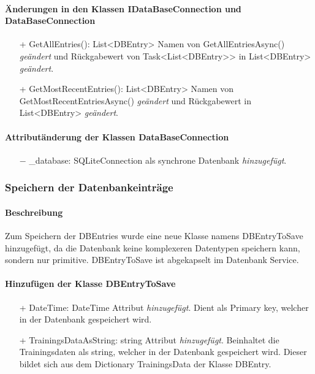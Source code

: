 \documentclass[a4paper,12pt]{article}
\begin{document}
\paragraph{Änderungen in den Klassen IDataBaseConnection und DataBaseConnection}
\begin{itemize}
	\item[+] GetAllEntries(): List<DBEntry> Namen von GetAllEntriesAsync() \textit{geändert} und Rückgabewert von Task<List<DBEntry>> in List<DBEntry> \textit{geändert}.
	\item[+] GetMostRecentEntries(): List<DBEntry> Namen von GetMostRecentEntriesAsync() \textit{geändert} und Rückgabewert in List<DBEntry> \textit{geändert}.
\end{itemize}
\paragraph{Attributänderung der Klassen DataBaseConnection}
\begin{itemize}
	\item[$-$] \_database: SQLiteConnection als synchrone Datenbank \textit{hinzugefügt}.
\end{itemize}

\subsubsection{Speichern der Datenbankeinträge}
\paragraph{Beschreibung}
Zum Speichern der DBEntries wurde eine neue Klasse namens DBEntryToSave hinzugefügt, da die Datenbank keine komplexeren Datentypen speichern kann, sondern nur primitive. DBEntryToSave ist abgekapselt im Datenbank Service. 

\paragraph{Hinzufügen der Klasse DBEntryToSave}
\begin{itemize}
	\item[+] DateTime: DateTime  Attribut \textit{hinzugefügt}. Dient als Primary key, welcher in der Datenbank gespeichert wird.
	\item[+] TrainingsDataAsString: string  Attribut \textit{hinzugefügt}. Beinhaltet die Trainingsdaten als string, welcher in der Datenbank gespeichert wird. Dieser bildet sich aus dem Dictionary TrainingsData der Klasse DBEntry.
\end{itemize}
\end{document}
